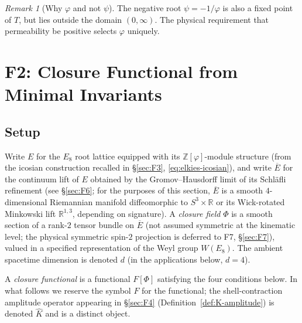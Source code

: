 \documentclass[12pt]{article}
\theoremstyle{definition}
\theoremstyle{remark}
\newtheorem{remark}[theorem]{Remark}
\newcommand{\Zphi}{\mathbb{Z}[\varphi]}
\begin{document}
\begin{remark}[Why $\varphi$ and not $\psi$]
The negative root $\psi = -1/\varphi$ is also a fixed point of $T$, but lies outside the domain $(0, \infty)$. The physical requirement that permeability be positive selects $\varphi$ uniquely.
\end{remark}

\section{F2: Closure Functional from Minimal Invariants}\label{sec:F2}

\subsection{Setup}

Write $E$ for the $E_8$ root lattice equipped with its $\Zphi$-module structure (from the icosian construction recalled in \S\ref{sec:F3}, \eqref{eq:elkies-icosian}), and write $\overline{E}$ for the continuum lift of $E$ obtained by the Gromov--Hausdorff limit of its Schl\"afli refinement (see \S\ref{sec:F6}; for the purposes of this section, $\overline{E}$ is a smooth $4$-dimensional Riemannian manifold diffeomorphic to $S^3 \times \mathbb{R}$ or its Wick-rotated Minkowski lift $\mathbb{R}^{1,3}$, depending on signature). A \emph{closure field} $\Phi$ is a smooth section of a rank-$2$ tensor bundle on $\overline{E}$ (not assumed symmetric at the kinematic level; the physical symmetric spin-$2$ projection is deferred to F7, \S\ref{sec:F7}), valued in a specified representation of the Weyl group $W(E_8)$. The ambient spacetime dimension is denoted $d$ (in the applications below, $d = 4$).

A \emph{closure functional} is a functional $F[\Phi]$ satisfying the four conditions below. In what follows we reserve the symbol $F$ for the functional; the shell-contraction amplitude operator appearing in \S\ref{sec:F4} (Definition~\ref{def:K-amplitude}) is denoted $\widehat{K}$ and is a distinct object.
\end{document}
